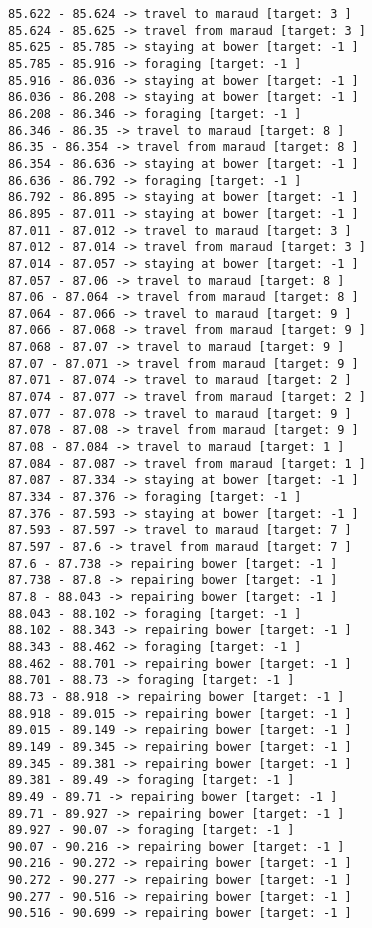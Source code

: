 \documentclass[11pt]{article}
\begin{document}
\begin{Verbatim}[commandchars=\\\{\}]
85.622 - 85.624 -> travel to maraud [target: 3 ]
85.624 - 85.625 -> travel from maraud [target: 3 ]
85.625 - 85.785 -> staying at bower [target: -1 ]
85.785 - 85.916 -> foraging [target: -1 ]
85.916 - 86.036 -> staying at bower [target: -1 ]
86.036 - 86.208 -> staying at bower [target: -1 ]
86.208 - 86.346 -> foraging [target: -1 ]
86.346 - 86.35 -> travel to maraud [target: 8 ]
86.35 - 86.354 -> travel from maraud [target: 8 ]
86.354 - 86.636 -> staying at bower [target: -1 ]
86.636 - 86.792 -> foraging [target: -1 ]
86.792 - 86.895 -> staying at bower [target: -1 ]
86.895 - 87.011 -> staying at bower [target: -1 ]
87.011 - 87.012 -> travel to maraud [target: 3 ]
87.012 - 87.014 -> travel from maraud [target: 3 ]
87.014 - 87.057 -> staying at bower [target: -1 ]
87.057 - 87.06 -> travel to maraud [target: 8 ]
87.06 - 87.064 -> travel from maraud [target: 8 ]
87.064 - 87.066 -> travel to maraud [target: 9 ]
87.066 - 87.068 -> travel from maraud [target: 9 ]
87.068 - 87.07 -> travel to maraud [target: 9 ]
87.07 - 87.071 -> travel from maraud [target: 9 ]
87.071 - 87.074 -> travel to maraud [target: 2 ]
87.074 - 87.077 -> travel from maraud [target: 2 ]
87.077 - 87.078 -> travel to maraud [target: 9 ]
87.078 - 87.08 -> travel from maraud [target: 9 ]
87.08 - 87.084 -> travel to maraud [target: 1 ]
87.084 - 87.087 -> travel from maraud [target: 1 ]
87.087 - 87.334 -> staying at bower [target: -1 ]
87.334 - 87.376 -> foraging [target: -1 ]
87.376 - 87.593 -> staying at bower [target: -1 ]
87.593 - 87.597 -> travel to maraud [target: 7 ]
87.597 - 87.6 -> travel from maraud [target: 7 ]
87.6 - 87.738 -> repairing bower [target: -1 ]
87.738 - 87.8 -> repairing bower [target: -1 ]
87.8 - 88.043 -> repairing bower [target: -1 ]
88.043 - 88.102 -> foraging [target: -1 ]
88.102 - 88.343 -> repairing bower [target: -1 ]
88.343 - 88.462 -> foraging [target: -1 ]
88.462 - 88.701 -> repairing bower [target: -1 ]
88.701 - 88.73 -> foraging [target: -1 ]
88.73 - 88.918 -> repairing bower [target: -1 ]
88.918 - 89.015 -> repairing bower [target: -1 ]
89.015 - 89.149 -> repairing bower [target: -1 ]
89.149 - 89.345 -> repairing bower [target: -1 ]
89.345 - 89.381 -> repairing bower [target: -1 ]
89.381 - 89.49 -> foraging [target: -1 ]
89.49 - 89.71 -> repairing bower [target: -1 ]
89.71 - 89.927 -> repairing bower [target: -1 ]
89.927 - 90.07 -> foraging [target: -1 ]
90.07 - 90.216 -> repairing bower [target: -1 ]
90.216 - 90.272 -> repairing bower [target: -1 ]
90.272 - 90.277 -> repairing bower [target: -1 ]
90.277 - 90.516 -> repairing bower [target: -1 ]
90.516 - 90.699 -> repairing bower [target: -1 ]

\end{Verbatim}
\end{document}
